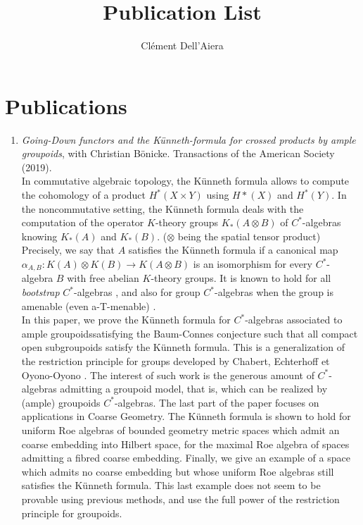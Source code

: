 \documentclass[a4paper]{article}
\title{Publication List}
\date{}
\author{ Clément Dell'Aiera}
\begin{document}
\maketitle

\section*{Publications}
\begin{enumerate}
\item \textit{Going-Down functors and the Künneth-formula for crossed products by ample groupoids}, with Christian Bönicke. Transactions of the American Society (2019).\\

In commutative algebraic topology, the K\"unneth formula allows to compute the cohomology of a product $H^*(X\times Y)$ using $H*(X)$ and $H^*(Y)$. In the noncommutative setting, the K\"unneth formula deals with the computation of the operator $K$-theory groups $K_*(A \otimes B)$ of $C^*$-algebras knowing $K_*(A)$ and $K_*(B)$. ($\otimes$ being the spatial tensor product) Precisely, we say that $A$ satisfies the K\"unneth formula if a canonical map $\alpha_{A,B}: K(A)\otimes K(B) \rightarrow K(A\otimes B)$ is an isomorphism for every $C^*$-algebra $B$ with free abelian $K$-theory groups. It is known to hold for all \textit{bootstrap} $C^*$-algebras \cite{rosenberg1987kunneth}, and also for group $C^*$-algebras when the group is amenable (even a-T-menable) \cite{BaumConnesHigson}\cite{TuThese}. \\

In this paper, we prove the K\"unneth formula for $C^*$-algebras associated to ample groupoidssatisfying the Baum-Connes conjecture such that all compact open subgroupoids satisfy the K\"unneth formula. This is a generalization of the restriction principle for groups developed by Chabert, Echterhoff et Oyono-Oyono \cite{ChabertEOY}. The interest of such work is the generous amount of $C^*$-algebras admitting a groupoid model, that is, which can be realized by (ample) groupoids $C^*$-algebras. The last part of the paper focuses on applications in Coarse Geometry. The K\"unneth formula is shown to hold for uniform Roe algebras of bounded geometry metric spaces which admit an coarse embedding into Hilbert space, for the maximal Roe algebra of spaces admitting a fibred coarse embedding. Finally, we give an example of a space which admits no coarse embedding but whose uniform Roe algebras still satisfies the K\"unneth formula. This last example does not seem to be provable using previous methods, and use the full power of the restriction principle for groupoids.


\end{enumerate}
\end{document}
